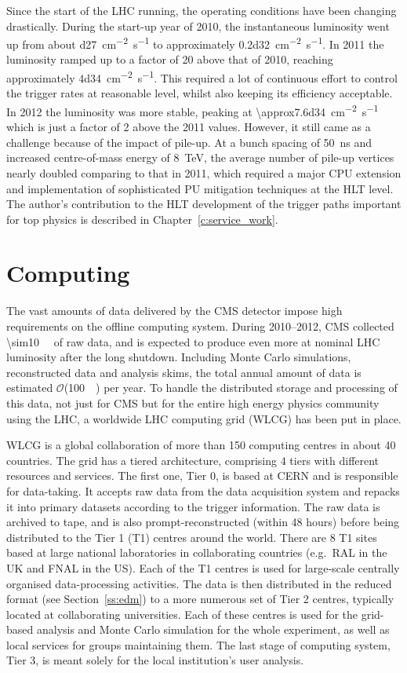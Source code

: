 Since the start of the LHC running, the operating conditions have been changing drastically. During the start-up year of
2010, the instantaneous luminosity went up from about \SI{d27}{\cm^{-2} s^{-1}} to approximately \SI{0.2d32}{\cm^{-2}
s^{-1}}. In 2011 the luminosity ramped up to a factor of \num{20} above that of 2010, reaching approximately
\SI{4d34}{\cm^{-2} s^{-1}}. This required a lot of continuous effort to control the trigger rates at reasonable level,
whilst also keeping its efficiency acceptable. In 2012 the luminosity was more stable, peaking at
\SI{\approx7.6d34}{\cm^{-2} s^{-1}} which is just a factor of 2 above the 2011 values. However, it still came as a
challenge because of the impact of pile-up. At a bunch spacing of \SI{50}{\ns} and increased centre-of-mass energy of
\SI{8}{\TeV}, the average number of pile-up vertices nearly doubled comparing to that in 2011, which required a major
CPU extension and implementation of sophisticated PU mitigation techniques at the HLT level. The author's contribution
to the HLT development of the trigger paths important for top physics is described in Chapter~\ref{c:service_work}.

\section{Computing}
\label{s:computing}
The vast amounts of data delivered by the CMS detector impose high requirements on the offline computing system. During
2010--2012, CMS collected \SI{\sim10}{\peta\byte} of raw data, and is expected to produce even more at nominal LHC
luminosity after the long shutdown. Including Monte Carlo simulations, reconstructed data and analysis skims, the total
annual amount of data is estimated $\mathcal{O}$(\SI{100}{\peta\byte}) per year. To handle the distributed storage and
processing of this data, not just for CMS but for the entire high energy physics community using the LHC, a worldwide
LHC computing grid (WLCG) has been put in place.

WLCG is a global collaboration of more than 150 computing centres in about 40 countries. The grid has a tiered
architecture, comprising 4 tiers with different resources and services. The first one, Tier 0, is based at CERN and is
responsible for data-taking. It accepts raw data from the data acquisition system and repacks it into primary datasets
according to the trigger information. The raw data is archived to tape, and is also prompt-reconstructed (within 48
hours) before being distributed to the Tier 1 (T1) centres around the world. There are 8 T1 sites based at large
national laboratories in collaborating countries (e.g.\ RAL in the UK and FNAL in the US). Each of the T1 centres is
used for large-scale centrally organised data-processing activities. The data is then distributed in the reduced format
(see Section~\ref{ss:edm}) to a more numerous set of Tier 2 centres, typically located at collaborating universities.
Each of these centres is used for the grid-based analysis and Monte Carlo simulation for the whole experiment, as well
as local services for groups maintaining them. The last stage of computing system, Tier 3, is meant solely for the local
institution's user analysis.

